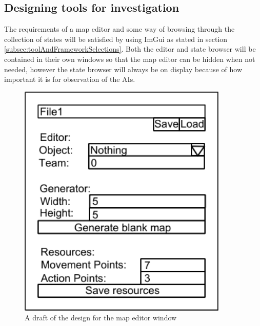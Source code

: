 \documentclass[11pt, a4paper]{report}
\begin{document}
\subsection{Designing tools for investigation}
\label{subsec:designingToolsForInvestigation}

The requirements of a map editor and some way of browsing through the collection of states will be satisfied by using ImGui \parencite{Imgui} as stated in section \ref{subsec:toolAndFrameworkSelections}. Both the editor and state browser will be contained in their own windows so that the map editor can be hidden when not needed, however the state browser will always be on display because of how important it is for observation of the AIs.

\begin{figure}[!h]
  \centering
  \includegraphics[width=10cm]{img/map_editor.png}
  \caption{A draft of the design for the map editor window}
  \label{fig:mapEditor}
\end{figure}
\end{document}
